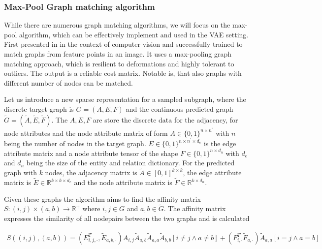 \subsubsection{Max-Pool Graph matching algorithm}


While there are numerous graph matching algorithms, we will focus on the max-pool algorithm, which can be effectively implement and used in the VAE setting. First presented in \cite{cho_finding_2014} in the context of computer vision and successfully trained to match graphs from feature points in an image. It uses a max-pooling graph matching approach, which is resilient to deformations and highly tolerant to outliers. The output is a reliable cost matrix. Notable is, that also graphs with different number of nodes can be matched.


Let us introduce a new sparse representation for a sampled subgraph, where the discrete target graph is $G=(A, E, F)$ and the continuous predicted graph $\widetilde{G}=(\widetilde{A}, \widetilde{E}, \widetilde{F})$. The $A, E, F$ are store the discrete data for the adjacency, for node attributes and the node attribute matrix of form $A \in\{0,1\}^{n \times n^{\prime}}$ with $n$ being the number of nodes in the target graph. $E\in\{0,1\}^{n \times n^{\prime} \times d_e}$ is the edge attribute matrix and a node attribute tensor of the shape $F\in\{0,1\}^{n \times d_n}$ with $d_e$ and $d_n$ being the size of the entity and relation dictionary. For the predicted graph with $k$ nodes, the adjacency matrix is $\widetilde{A} \in[0,1]^{k \times k}$, the edge attribute matrix is $\widetilde{E} \in \mathbb{R}^{k \times k \times d_{e}}$ and the node attribute matrix is $\widetilde{F} \in \mathbb{R}^{k \times d_{n}}$.


Given these graphs the algorithm aims to find the affinity matrix $S:(i, j) \times(a, b) \rightarrow \mathbb{R}^{+}$ where $i, j \in G$ and $a, b \in \widetilde{G}$. The affinity matrix expresses the similarity of all nodepairs between the two graphs and is calculated 

\begin{equation}
    \begin{array}{l}
        S((i, j),(a, b)) = \left(E_{i, j, \cdot}^{T}, \widetilde{E}_{a, b, \cdot}\right) A_{i, j} \widetilde{A}_{a, b} \widetilde{A}_{a, a} \widetilde{A}_{b, b}[i \neq j \wedge a \neq b] + \left(F_{i, \cdot}^{T} \widetilde{F}_{a, \cdot}\right) \widetilde{A}_{a, a}[i=j \wedge a=b]
    \end{array}
\label{eq3:s}
\end{equation}

